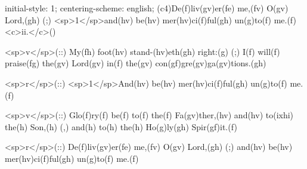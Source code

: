 initial-style: 1;
centering-scheme: english;
(c4)De(f)liv(gv)er(fe) me,(fv) O(gv) Lord,(gh) (;) <sp>1</sp>and(hv) be(hv) mer(hv)ci(f)ful(gh) un(g)to(f) me.(f) <c>ii.</c>()

<sp>v</sp>(::) My(fh) foot(hv) stand-(hv)eth(gh) right:(g) (;) I(f) will(f) praise(fg) the(gv) Lord(gv) in(f) the(gv) con(gf)gre(gv)ga(gv)tions.(gh)

<sp>r</sp>(::) <sp>1</sp>And(hv) be(hv) mer(hv)ci(f)ful(gh) un(g)to(f) me.(f)

<sp>v</sp>(::) Glo(f)ry(f) be(f) to(f) the(f) Fa(gv)ther,(hv) and(hv) to(ixhi) the(h) Son,(h) (,) and(h) to(h) the(h) Ho(g)ly(gh) Spir(gf)it.(f)

<sp>r</sp>(::) De(f)liv(gv)er(fe) me,(fv) O(gv) Lord,(gh) (;) and(hv) be(hv) mer(hv)ci(f)ful(gh) un(g)to(f) me.(f)